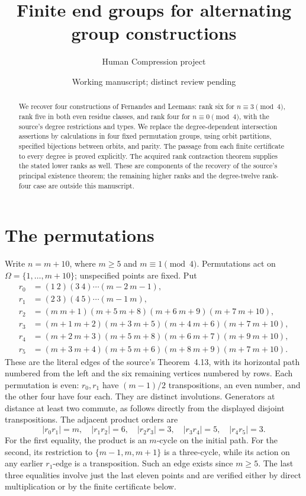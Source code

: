 \documentclass[11pt]{article}
\title{Finite end groups for alternating group constructions}
\author{Human Compression project}
\date{Working manuscript; distinct review pending}
\begin{document}
\maketitle
\begin{abstract}
We recover four constructions of Fernandes and Leemans: rank six for
$n\equiv3\pmod4$, rank five in both even residue classes, and rank four
for $n\equiv0\pmod4$, with the source's degree restrictions and types.
We replace the degree-dependent intersection assertions by calculations
in four fixed permutation groups, using orbit partitions, specified
bijections between orbits, and parity. The passage from each finite
certificate to every degree is proved explicitly. The acquired rank
contraction theorem supplies the stated lower ranks as well. These are
components of the recovery of the source's principal existence theorem;
the remaining higher ranks and the degree-twelve rank-four case are
outside this manuscript.
\end{abstract}

\section{The permutations}
Write $n=m+10$, where $m\geq5$ and $m\equiv1\pmod4$. Permutations act on
$\Omega=\{1,\ldots,m+10\}$; unspecified points are fixed. Put
\begin{align*}
r_0&=(1\ 2)(3\ 4)\cdots(m-2\ m-1),\\
r_1&=(2\ 3)(4\ 5)\cdots(m-1\ m),\\
r_2&=(m\ m+1)(m+5\ m+8)(m+6\ m+9)(m+7\ m+10),\\
r_3&=(m+1\ m+2)(m+3\ m+5)(m+4\ m+6)(m+7\ m+10),\\
r_4&=(m+2\ m+3)(m+5\ m+8)(m+6\ m+7)(m+9\ m+10),\\
r_5&=(m+3\ m+4)(m+5\ m+6)(m+8\ m+9)(m+7\ m+10).
\end{align*}
These are the literal edges of the source's Theorem~4.13, with its
horizontal path numbered from the left and the six remaining vertices
numbered by rows. Each permutation is even: $r_0,r_1$ have $(m-1)/2$
transpositions, an even number, and the other four have four each.
They are distinct involutions. Generators at distance at least two
commute, as follows directly from the displayed disjoint transpositions.
The adjacent product orders are
\begin{equation}\label{type}
 |r_0r_1|=m,\quad |r_1r_2|=6,\quad |r_2r_3|=3,
 \quad |r_3r_4|=5,\quad |r_4r_5|=3.
\end{equation}
For the first equality, the product is an $m$-cycle on the initial path.
For the second, its restriction to $\{m-1,m,m+1\}$ is a three-cycle,
while its action on any earlier $r_1$-edge is a transposition. Such an
edge exists since $m\geq5$. The last three equalities involve just the
last eleven points and are verified either by direct multiplication or
by the finite certificate below.
\end{document}
